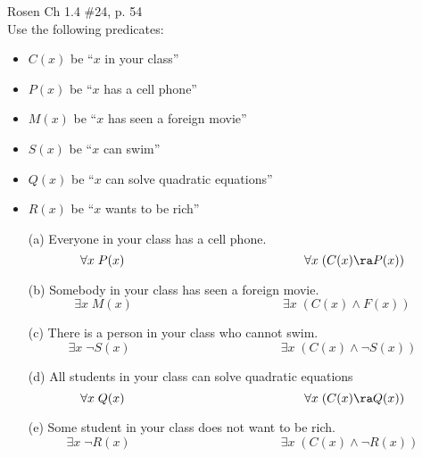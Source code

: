 \begin{questions}
 Rosen Ch 1.4 \#24, p. 54 \\
Use the following predicates:
\begin{itemize}[itemsep=0pt,parsep=0pt,topsep=0pt,partopsep=0pt]
  \item $C(x)$ be ``$x$ in your class''
  \item $P(x)$ be ``$x$ has a cell phone''
  \item $M(x)$ be ``$x$ has seen a foreign movie''
  \item $S(x)$ be ``$x$ can swim''
  \item $Q(x)$ be ``$x$ can solve quadratic equations''
  \item $R(x)$ be ``$x$ wants to be rich''
\end{itemize}
  \begin{solution}
    \begin{itemize}[itemsep=0pt,parsep=0pt,topsep=0pt,partopsep=0pt]
        \item[(a)] Everyone in your class has a cell phone.
        $$ \forall x\; P(x) \hspace{2in} \forall x\; (C(x) \ra P(x))$$
       \item[(b)] Somebody in your class has seen a foreign movie.
       $$ \exists x\; M(x) \hspace{2in} \exists x\; (C(x) \wedge F(x))$$
       \item[(c)] There is a person in your class who cannot swim.
       $$ \exists x\; \neg S(x) \hspace{2in} \exists x\; (C(x) \wedge \neg S(x))$$
        \item[(d)] All students in your class can solve quadratic equations
        $$ \forall x\; Q(x) \hspace{2in} \forall x\; (C(x) \ra Q(x))$$
        \item[(e)] Some student in your class does not want to be rich.
        $$ \exists x\; \neg R(x) \hspace{2in} \exists x\; (C(x) \wedge \neg R(x))$$
    \end{itemize}

  \end{solution}



\end{questions}
